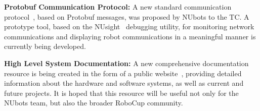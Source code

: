 \documentclass{llncs}
\begin{document}
\noindent\textbf{Protobuf Communication Protocol:}
A new standard communication protocol~\cite{nubotsProtocolGit}, based on Protobuf messages, was proposed by NUbots to the TC. A prototype tool, based on the NUsight~\cite{nubotsNUsightGit} debugging utility, for monitoring network communications and displaying robot communications in a meaningful manner is currently being developed.\newline

\noindent\textbf{High Level System Documentation:} 
A new comprehensive documentation resource is being created in the form of a public website~\cite{nubotsNUbookGit}, providing detailed information about the hardware and software systems, as well as current and future projects. It is hoped that this resource will be useful not only for the NUbots team, but also the broader RoboCup community. \newline



\end{document}
